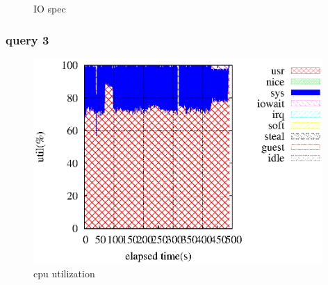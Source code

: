 \documentclass[11pt,a4paper]{jsarticle}
\newlength{\subfigwidth}
\newlength{\subfigcolsep}
\begin{document}
\begin{figure}[thbp]
 \setlength{\subfigwidth}{.5\linewidth}
 \addtolength{\subfigwidth}{-.5\subfigcolsep}
 \begin{minipage}[b]{\subfigwidth}
 \end{minipage}
  \begin{minipage}[b]{\subfigwidth}
  \end{minipage}
  \caption{IO spec}
  \label{fig:4}
\end{figure}

\clearpage
\subsubsection*{query 3}
\begin{figure}[thbp]
 \begin{center}
  \includegraphics[width=110mm]{vms03_1core1.eps}
 \end{center}
 \caption{cpu utilization}
 \label{fig:5cpu}
\end{figure}
\end{document}
